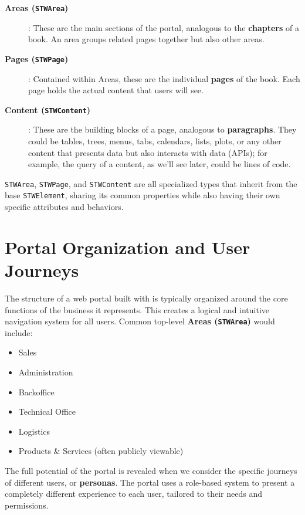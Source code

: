 \begin{description}
\item[\textbf{Areas (\texttt{STWArea})}]: These are the main sections of the portal, analogous to the \textbf{chapters} of a book. An area groups related pages together but also other areas.
\item[\textbf{Pages (\texttt{STWPage})}]: Contained within Areas, these are the individual \textbf{pages} of the book. Each page holds the actual content that users will see.
\item[\textbf{Content (\texttt{STWContent})}]: These are the building blocks of a page, analogous to \textbf{paragraphs}. They could be tables, trees, menus, tabs, calendars, lists, plots, or any other content that presents data but also interacts with data (APIs); for example, the query of a content, as we'll see later, could be lines of code. 
\end{description}

	\texttt{STWArea}, \texttt{STWPage}, and \texttt{STWContent} are all specialized types that inherit from the base \texttt{STWElement}, sharing its common properties while also having their own specific attributes and behaviors.

\section{Portal Organization and User Journeys}
\label{sec:user-journeys}

The structure of a web portal built with \wbdl{} is typically organized around the core functions of the business it represents. This creates a logical and intuitive navigation system for all users. Common top-level \textbf{Areas (\texttt{STWArea})} would include:

\begin{itemize}
	\item Sales
	\item Administration
	\item Backoffice
	\item Technical Office
	\item Logistics
	\item Products \& Services (often publicly viewable)
\end{itemize}

The full potential of the portal is revealed when we consider the specific journeys of different users, or \textbf{personas}. The portal uses a role-based system to present a completely different experience to each user, tailored to their needs and permissions.

